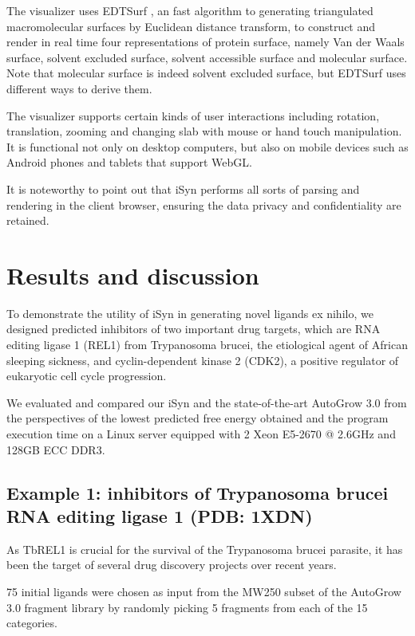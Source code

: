 The visualizer uses EDTSurf \citep{1297,1350}, an fast algorithm to generating triangulated macromolecular surfaces by Euclidean distance transform, to construct and render in real time four representations of protein surface, namely Van der Waals surface, solvent excluded surface, solvent accessible surface and molecular surface. Note that molecular surface is indeed solvent excluded surface, but EDTSurf uses different ways to derive them.

The visualizer supports certain kinds of user interactions including rotation, translation, zooming and changing slab with mouse or hand touch manipulation. It is functional not only on desktop computers, but also on mobile devices such as Android phones and tablets that support WebGL.

It is noteworthy to point out that iSyn performs all sorts of parsing and rendering in the client browser, ensuring the data privacy and confidentiality are retained.

\section{Results and discussion}

To demonstrate the utility of iSyn in generating novel ligands ex nihilo, we designed predicted inhibitors of two important drug targets, which are RNA editing ligase 1 (REL1) from Trypanosoma brucei, the etiological agent of African sleeping sickness, and cyclin-dependent kinase 2 (CDK2), a positive regulator of eukaryotic cell cycle progression.

We evaluated and compared our iSyn and the state-of-the-art AutoGrow 3.0 from the perspectives of the lowest predicted free energy obtained and the program execution time on a Linux server equipped with 2 Xeon E5-2670 @ 2.6GHz and 128GB ECC DDR3.

\subsection{Example 1: inhibitors of Trypanosoma brucei RNA editing ligase 1 (PDB: 1XDN)}

As TbREL1 is crucial for the survival of the Trypanosoma brucei parasite, it has been the target of several drug discovery projects over recent years.

75 initial ligands were chosen as input from the MW250 subset of the AutoGrow 3.0 fragment library by randomly picking 5 fragments from each of the 15 categories.

